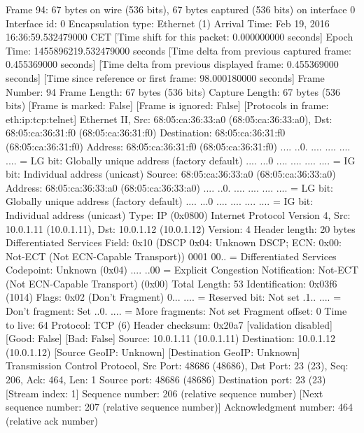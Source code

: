 Frame 94: 67 bytes on wire (536 bits), 67 bytes captured (536 bits) on interface 0
    Interface id: 0
    Encapsulation type: Ethernet (1)
    Arrival Time: Feb 19, 2016 16:36:59.532479000 CET
    [Time shift for this packet: 0.000000000 seconds]
    Epoch Time: 1455896219.532479000 seconds
    [Time delta from previous captured frame: 0.455369000 seconds]
    [Time delta from previous displayed frame: 0.455369000 seconds]
    [Time since reference or first frame: 98.000180000 seconds]
    Frame Number: 94
    Frame Length: 67 bytes (536 bits)
    Capture Length: 67 bytes (536 bits)
    [Frame is marked: False]
    [Frame is ignored: False]
    [Protocols in frame: eth:ip:tcp:telnet]
Ethernet II, Src: 68:05:ca:36:33:a0 (68:05:ca:36:33:a0), Dst: 68:05:ca:36:31:f0 (68:05:ca:36:31:f0)
    Destination: 68:05:ca:36:31:f0 (68:05:ca:36:31:f0)
        Address: 68:05:ca:36:31:f0 (68:05:ca:36:31:f0)
        .... ..0. .... .... .... .... = LG bit: Globally unique address (factory default)
        .... ...0 .... .... .... .... = IG bit: Individual address (unicast)
    Source: 68:05:ca:36:33:a0 (68:05:ca:36:33:a0)
        Address: 68:05:ca:36:33:a0 (68:05:ca:36:33:a0)
        .... ..0. .... .... .... .... = LG bit: Globally unique address (factory default)
        .... ...0 .... .... .... .... = IG bit: Individual address (unicast)
    Type: IP (0x0800)
Internet Protocol Version 4, Src: 10.0.1.11 (10.0.1.11), Dst: 10.0.1.12 (10.0.1.12)
    Version: 4
    Header length: 20 bytes
    Differentiated Services Field: 0x10 (DSCP 0x04: Unknown DSCP; ECN: 0x00: Not-ECT (Not ECN-Capable Transport))
        0001 00.. = Differentiated Services Codepoint: Unknown (0x04)
        .... ..00 = Explicit Congestion Notification: Not-ECT (Not ECN-Capable Transport) (0x00)
    Total Length: 53
    Identification: 0x03f6 (1014)
    Flags: 0x02 (Don't Fragment)
        0... .... = Reserved bit: Not set
        .1.. .... = Don't fragment: Set
        ..0. .... = More fragments: Not set
    Fragment offset: 0
    Time to live: 64
    Protocol: TCP (6)
    Header checksum: 0x20a7 [validation disabled]
        [Good: False]
        [Bad: False]
    Source: 10.0.1.11 (10.0.1.11)
    Destination: 10.0.1.12 (10.0.1.12)
    [Source GeoIP: Unknown]
    [Destination GeoIP: Unknown]
Transmission Control Protocol, Src Port: 48686 (48686), Dst Port: 23 (23), Seq: 206, Ack: 464, Len: 1
    Source port: 48686 (48686)
    Destination port: 23 (23)
    [Stream index: 1]
    Sequence number: 206    (relative sequence number)
    [Next sequence number: 207    (relative sequence number)]
    Acknowledgment number: 464    (relative ack number)
